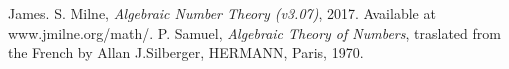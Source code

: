 \documentclass[11pt,a4paper,reqno]{amsart}
\numberwithin{equation}{section}
\newtheorem{lem}[thm]{Lemma}
\newtheorem{prop}[thm]{Proposition}
\begin{document}




\begin{thebibliography}{alpha} 
 James. S. Milne, \emph{Algebraic Number Theory (v3.07)}, 2017. Available at www.jmilne.org/math/. 
 P. Samuel, \emph{Algebraic Theory of Numbers}, traslated from the French by Allan J.Silberger, HERMANN, Paris, 1970.
\end{thebibliography} 
\end{document}
